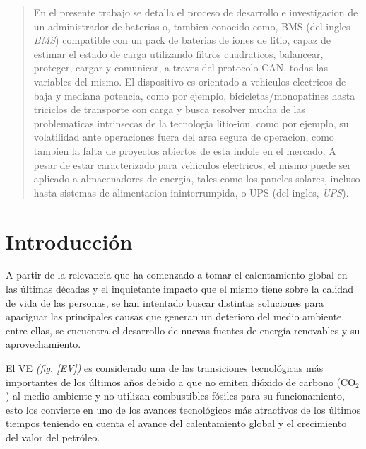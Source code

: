 \documentclass[10pt,a4paper]{article}
\begin{document}
    \begin{abstract}
        \noindent En el presente trabajo se detalla el proceso de desarrollo e
        investigacion de un administrador de baterias o, tambien conocido como,
        \acrshort{BMS} (del ingles \emph{\acrlong{BMS}}) compatible con un pack
        de baterias de iones de litio, capaz de estimar el estado de carga 
        utilizando filtros cuadraticos, balancear, proteger, cargar y 
        comunicar, a traves del protocolo \acrshort{CAN}, todas 
        las variables del mismo. El dispositivo es orientado a vehiculos 
        electricos de baja y mediana potencia, como por ejemplo, 
        bicicletas/monopatines hasta triciclos de transporte con carga
        y busca resolver mucha de las problematicas intrinsecas de 
        la tecnologia litio-ion, como por ejemplo, su volatilidad ante 
        operaciones fuera del area segura de operacion, 
        como tambien la falta de proyectos abiertos de esta indole en el mercado. 
        A pesar de estar caracterizado para vehiculos electricos, el mismo 
        puede ser aplicado a almacenadores de energia, tales como los paneles 
        solares, incluso hasta sistemas de alimentacion ininterrumpida, o \acrshort{UPS} 
        (del ingles, \emph{\acrlong{UPS}}).
    \end{abstract}

    \newpage
	\tableofcontents

    \newpage

	\section{Introducción}
	
	\noindent A partir de la relevancia que ha comenzado a tomar el 
    calentamiento global en las últimas décadas y el inquietante impacto que 
    el mismo tiene sobre la calidad de vida de las personas, se han intentado 
    buscar distintas soluciones para apaciguar las principales causas que 
    generan un deterioro del medio ambiente, entre ellas, se encuentra el 
    desarrollo de nuevas fuentes de energía renovables y su aprovechamiento.
	
    \noindent El \acrfull{VE} \emph{(fig. \ref{EV})} es considerado 
    una de las transiciones tecnológicas más importantes de los últimos años 
    debido a que no emiten dióxido de carbono ($\mathrm{CO_2}$) al medio 
    ambiente y no utilizan combustibles fósiles para su funcionamiento, esto 
    los convierte en uno de los avances tecnológicos más atractivos de los 
    últimos tiempos teniendo en cuenta el avance del calentamiento global y el 
    crecimiento del valor del petróleo.
\end{document}

